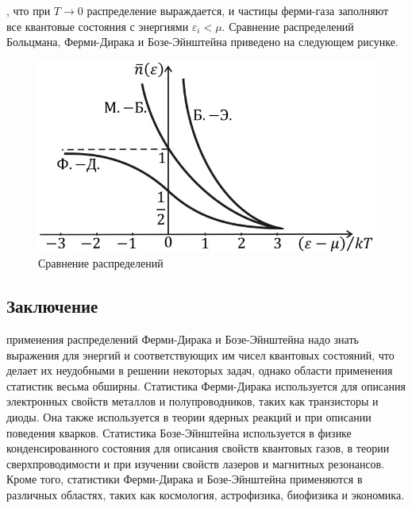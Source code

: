 \documentclass[a4paper,12pt]{article}
\begin{document}
\par\indent{}, что при $T\rightarrow 0$ распределение выраждается, и частицы ферми-газа заполняют все квантовые состояния с энергиями $\varepsilon_i < \mu$. Сравнение распределений Больцмана, Ферми-Дирака и Бозе-Эйнштейна приведено на следующем рисунке. 
\begin{figure}[h!]
\centering
\includegraphics[width=1\textwidth]{bfe1.jpg}
\caption{Сравнение распределений}
\end{figure}


\subsection*{Заключение}
\par\indent{} применения распределений Ферми-Дирака и Бозе-Эйнштейна надо знать выражения для энергий и соответствующих им чисел квантовых состояний, что делает их неудобными в решении некоторых задач, однако области применения статистик весьма обширны. Статистика Ферми-Дирака используется для описания электронных свойств металлов и полупроводников, таких как транзисторы и диоды. Она также используется в теории ядерных реакций и при описании поведения кварков. Статистика Бозе-Эйнштейна используется в физике конденсированного состояния для описания свойств квантовых газов, в теории сверхпроводимости и при изучении свойств лазеров и магнитных резонансов. Кроме того, статистики Ферми-Дирака и Бозе-Эйнштейна применяются в различных областях, таких как космология, астрофизика, биофизика и экономика.
\end{document}
